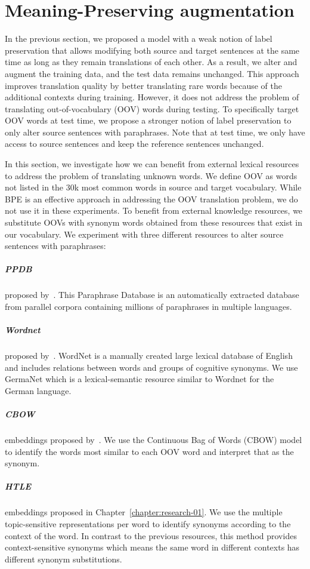 \section{Meaning-Preserving augmentation}  \label{tda:semantic}

In the previous section, we proposed a model with a weak notion of label preservation that allows modifying both source and target sentences at the same time as long as they remain translations of each other. 
As a result, we alter and augment the training data, and the test data remains unchanged. 
%
This approach improves translation quality by better translating rare words because of the additional contexts during training. 
However, it does not address the problem of translating out-of-vocabulary (OOV) words during testing.
To specifically target OOV words at test time, we propose a stronger notion of label preservation to only alter source sentences with paraphrases. 
Note that at test time, we only have access to source sentences and keep the reference sentences unchanged. 

In this section, we investigate how we can benefit from external lexical resources to address the problem of translating unknown words. 
We define OOV as words not listed in the 30k most common words in source and target vocabulary. 
While BPE is an effective approach in addressing the OOV translation problem, we do not use it in these experiments.
To benefit from external knowledge resources, we substitute OOVs with synonym words obtained from these resources that exist in our vocabulary. 
%
We experiment with three different resources to alter source sentences with paraphrases:

\subparagraph{PPDB} proposed by~\citet{ganitkevitch-etal-2013-ppdb}. This Paraphrase Database is an automatically extracted database from parallel corpora containing millions of paraphrases in multiple languages.

\subparagraph{Wordnet} proposed by~\citet{miller1995wordnet}. WordNet is a manually created large lexical database of English and includes relations between words and groups of cognitive synonyms. We use GermaNet \citep{hamp-feldweg-1997-germanet,HENRICH10.264} which is a lexical-semantic resource similar to Wordnet for the German language.

\subparagraph{CBOW} embeddings proposed by~\citet{mikolov2013distributed}. We use the Continuous Bag of Words (CBOW) model to identify the words most similar to each OOV word and interpret that as the synonym. %
\subparagraph{HTLE} embeddings proposed in Chapter~\ref{chapter:research-01}. We use the multiple topic-sensitive representations per word to identify synonyms according to the context of the word. 
In contrast to the previous resources, this method provides context-sensitive synonyms which means the same word in different contexts has different synonym substitutions. 

